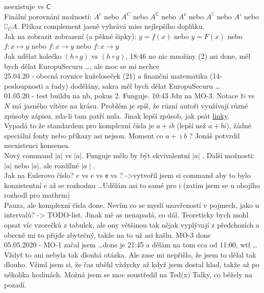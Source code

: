 \documentclass[12pt]{article}
\providecommand{\abs}[1]{\lvert#1\rvert}
\newcommand{\absb}[1]{\lvert#1\rvert}
\newcommand{\euler}{\mathrm{e}} %
\newcommand{\iu}{\mathrm{i}} %
\begin{document}
neexistuje vs $\mathsf{C}$\\
Finální porovnání možností: $A^c$ nebo $A^C$ nebo $A^\mathsf{C}$ nebo $A^\mathsf{c}$ nebo $A^\complement$ nebo $A'$ nebo $\complement_U A$. Příkaz complement jasně vyhrává miss nejlepšího doplňku.\\
Jak na zobrazit zobrazení (a pěkné šipky):  $y = f(x) $ nebo $ y = F(x) $ nebo $ f: x \mapsto y $ nebo $ f: x \to y $ nebo $ f: x \rightarrow y$ \\
Jak udělat kolečko $ (h ∘ g)$ vs $ (h \circ g)$, 18:46 no nic množiny (2) asi done, měl bych dělat EuropuSecuru \dots, ale moc se mi nechce\\
25.04.20 - obecná rovnice kuželoseček (21) a finanční matematika (14-posloupnosti a řady) dodělány, sakra měl bych dělat EuropuSecuru \dots \\
01.05.20 - test buildu na nb, pokus 2. Funguje. 10:43 Jdu na MO-3. Notace $\mathbb{N}$ vs $N$ má jasného vítěze na krásu. Problém je spíš, že různí autoři využívají různé způsoby zápisu, zda-li tam patří nula. Jinak lepší způsob, jak psát \href{https://www.latex-tutorial.com/tutorials/hyperlinks/}{linky}.\\
Vypadá to že standardem pro komplexní čísla je $a +ib$ (lepší než $a +bi$), žádné speciální fonty nebo příkazy asi nejsou. Moment co $a +\imath b$ ?  Jonáš potvrdil neexistenci konsensu.\\
Nový command $\abs{a}$ vs $\absb{a}$. Funguje mělo by být ekvivalentní $\lvert a \rvert$ . Další možnosti: $ \vert a \vert$ nebo $|a|$, ale rozdílné $ \mid a \mid$.\\
Jak na Eulerovo číslo? $e$ vs $\mathrm{e}$ vs $\mathsf{e}$ vs ? 	->vytvořil jsem si command aby to bylo konzistentní $\euler$ až se rozhodnu \dots Udělám asi to samé pro $\iu$ (zatím jsem se u obojího rozhodl pro mathrm)\\
Pauza, ale komplexní čísla done. Nevím co se myslí uzavřeností v pojmech, jako u intervalů? -> TODO-list. Jinak mě as nenapadá, co dál. Teoreticky bych mohl opsat víc vzorečků z tabulek, ale ony většinou tak nějak vyplývají z předchozích a obecně mi to přijde zbytečný, takže na to už asi kašlu. MO-3 done\\
05.05.2020 - MO-1 začal jsem \dots	done je 21:45 a dělám na tom cca od 11:00, wtf \dots  Vždyť to ani nebyla tak dlouhá otázka. Ale zase mi nepřišlo, že jsem to dělal tak dlouho. Všiml jsem si, že čas uběhl vždycky až když jsem dostal hlad, takže až po několika hodinách. Možná jsem  se moc soustředil na Ted(x) Talky, co běžely na pozadí.
\end{document}
